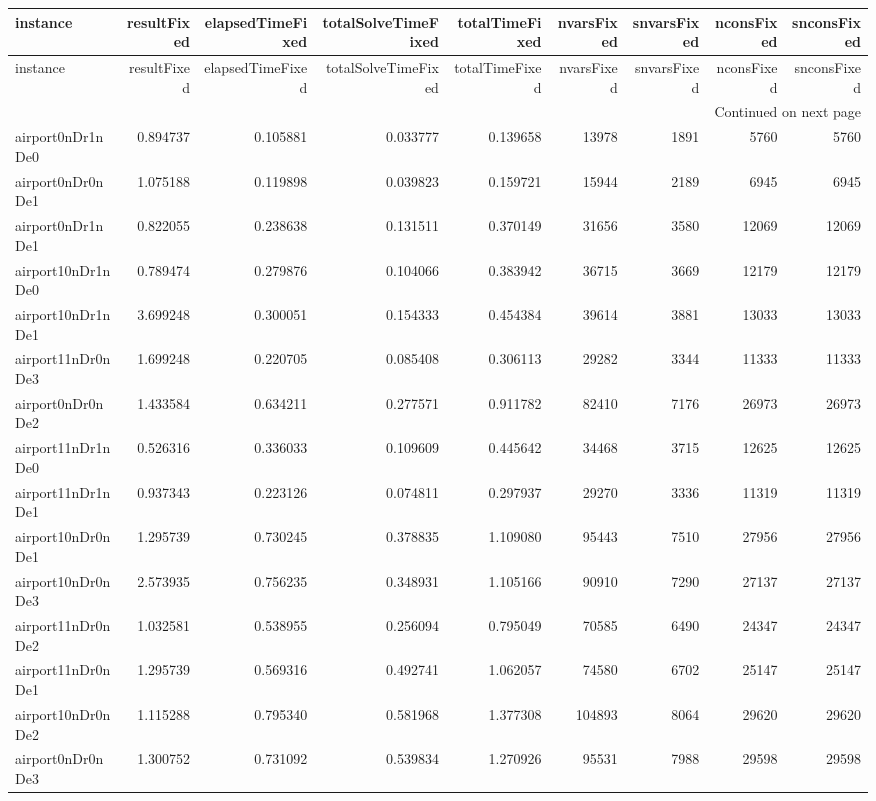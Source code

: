 \documentclass[../../../thesis.tex]{subfiles}
\begin{document}
\tiny
\begin{longtable}{|l|r|r|r|r|r|r|r|r|}
\toprule
instance & resultFixed & elapsedTimeFixed & totalSolveTimeFixed & totalTimeFixed & nvarsFixed & snvarsFixed & nconsFixed & snconsFixed \\
\midrule
\endfirsthead
\toprule
instance & resultFixed & elapsedTimeFixed & totalSolveTimeFixed & totalTimeFixed & nvarsFixed & snvarsFixed & nconsFixed & snconsFixed \\
\midrule
\endhead
\midrule
\multicolumn{9}{r}{Continued on next page} \\
\midrule
\endfoot
\bottomrule
\endlastfoot
airport0nDr1nDe0 & 0.894737 & 0.105881 & 0.033777 & 0.139658 & 13978 & 1891 & 5760 & 5760 \\
airport0nDr0nDe1 & 1.075188 & 0.119898 & 0.039823 & 0.159721 & 15944 & 2189 & 6945 & 6945 \\
airport0nDr1nDe1 & 0.822055 & 0.238638 & 0.131511 & 0.370149 & 31656 & 3580 & 12069 & 12069 \\
airport10nDr1nDe0 & 0.789474 & 0.279876 & 0.104066 & 0.383942 & 36715 & 3669 & 12179 & 12179 \\
airport10nDr1nDe1 & 3.699248 & 0.300051 & 0.154333 & 0.454384 & 39614 & 3881 & 13033 & 13033 \\
airport11nDr0nDe3 & 1.699248 & 0.220705 & 0.085408 & 0.306113 & 29282 & 3344 & 11333 & 11333 \\
airport0nDr0nDe2 & 1.433584 & 0.634211 & 0.277571 & 0.911782 & 82410 & 7176 & 26973 & 26973 \\
airport11nDr1nDe0 & 0.526316 & 0.336033 & 0.109609 & 0.445642 & 34468 & 3715 & 12625 & 12625 \\
airport11nDr1nDe1 & 0.937343 & 0.223126 & 0.074811 & 0.297937 & 29270 & 3336 & 11319 & 11319 \\
airport10nDr0nDe1 & 1.295739 & 0.730245 & 0.378835 & 1.109080 & 95443 & 7510 & 27956 & 27956 \\
airport10nDr0nDe3 & 2.573935 & 0.756235 & 0.348931 & 1.105166 & 90910 & 7290 & 27137 & 27137 \\
airport11nDr0nDe2 & 1.032581 & 0.538955 & 0.256094 & 0.795049 & 70585 & 6490 & 24347 & 24347 \\
airport11nDr0nDe1 & 1.295739 & 0.569316 & 0.492741 & 1.062057 & 74580 & 6702 & 25147 & 25147 \\
airport10nDr0nDe2 & 1.115288 & 0.795340 & 0.581968 & 1.377308 & 104893 & 8064 & 29620 & 29620 \\
airport0nDr0nDe3 & 1.300752 & 0.731092 & 0.539834 & 1.270926 & 95531 & 7988 & 29598 & 29598 \\

\end{longtable}
\end{document}
